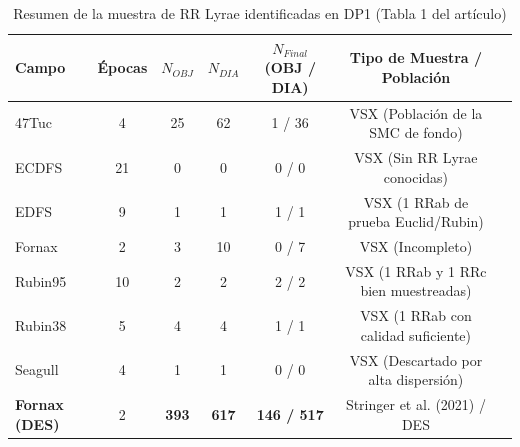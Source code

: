 \documentclass[11pt,a4paper]{article}
\begin{document}
\begin{table}[h]
\centering
\small
\caption{Resumen de la muestra de RR Lyrae identificadas en DP1 (Tabla 1 del artículo)}
\begin{tabularx}{\textwidth}{lcccccX}
\toprule
\textbf{Campo} & \textbf{Épocas} & $N_{OBJ}$ & $N_{DIA}$ & $N_{Final}$ (OBJ / DIA) & \textbf{Tipo de Muestra / Población} \\
\midrule
47Tuc    & 4  & 25  & 62  & 1 / 36   & VSX (Población de la SMC de fondo) \\
ECDFS    & 21 & 0   & 0   & 0 / 0    & VSX (Sin RR Lyrae conocidas) \\
EDFS     & 9  & 1   & 1   & 1 / 1    & VSX (1 RRab de prueba Euclid/Rubin) \\
Fornax   & 2  & 3   & 10  & 0 / 7    & VSX (Incompleto) \\
Rubin95  & 10 & 2   & 2   & 2 / 2    & VSX (1 RRab y 1 RRc bien muestreadas) \\
Rubin38  & 5  & 4   & 4   & 1 / 1    & VSX (1 RRab con calidad suficiente) \\
Seagull  & 4  & 1   & 1   & 0 / 0    & VSX (Descartado por alta dispersión) \\
\textbf{Fornax (DES)} & 2 & \textbf{393} & \textbf{617} & \textbf{146 / 517} & Stringer et al. (2021) / DES \\
\bottomrule
\end{tabularx}
\end{table}
\end{document}
